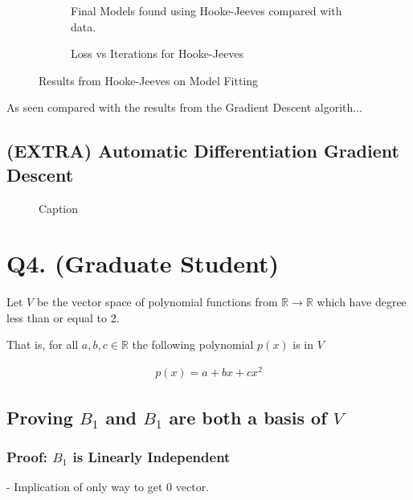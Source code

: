\documentclass{article}
\begin{document}
    \begin{figure}[H]
        \begin{subfigure}
            \centering
            
            \caption{Final Models found using Hooke-Jeeves compared with data.}
        \end{subfigure} 
        \begin{subfigure}
            \centering
            
            \caption{Loss vs Iterations for Hooke-Jeeves}
        \end{subfigure}
        \caption{Results from Hooke-Jeeves on Model Fitting}
        \label{fig:Q3_HookeJeeves}
    \end{figure}

    As seen compared with the results from the Gradient Descent algorith...

    \subsection{(EXTRA) Automatic Differentiation Gradient Descent}

    \begin{figure}[h]
        \centering
        
        \caption{Caption}
    \end{figure}

    \section{Q4. (Graduate Student)}

    Let $V$ be the vector space of polynomial functions from $\mathbb{R} \rightarrow \mathbb{R}$ which have degree less than or equal to 2.

    That is, for all $a, b, c \in \mathbb{R}$ the following polynomial $p(x)$ is in $V$
    
    \begin{align*}
    p(x) = a + bx + cx^2
    \end{align*}    

    \subsection{Proving $B_1$ and $B_1$ are both a basis of $V$}

    \subsubsection{Proof: $B_1$ is Linearly Independent}
    - Implication of only way to get 0 vector.
\end{document}
